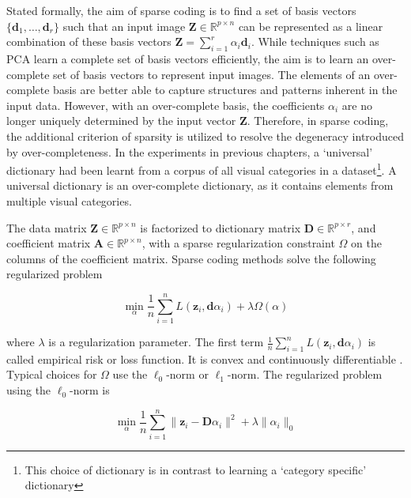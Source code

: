 Stated formally, the aim of sparse coding is to find a set of basis vectors $\{ \mathbf{d}_{1}, \ldots, \mathbf{d}_{r} \}$ such that an input image $\mathbf{Z} \in \mathds{R}^{p \times n}$ can be represented as a linear combination of these basis vectors $\mathbf{Z} = \sum_{i=1}^{r} \alpha_{i} \mathbf{d}_{i}$. While techniques such as PCA learn a complete set of basis vectors efficiently, the aim is to learn an over-complete set of basis vectors to represent input images. The elements of an over-complete basis are better able to capture structures and patterns inherent in the input data. However, with an over-complete basis, the coefficients $\alpha_{i}$ are no longer uniquely determined by the input vector $\mathbf{Z}$. Therefore, in sparse coding, the additional criterion of sparsity is utilized to resolve the degeneracy introduced by over-completeness. In the experiments in previous chapters, a `universal' dictionary had been learnt from a corpus of all visual categories in a dataset\footnote{This choice of dictionary is in contrast to learning a `category specific' dictionary}. A universal dictionary is an over-complete dictionary, as it contains elements from multiple visual categories. 

The data matrix $\mathbf{Z} \in \mathds{R}^{p \times n}$ is factorized to dictionary matrix $\mathbf{D} \in \mathds{R}^{p \times r}$, and coefficient matrix $\mathbf{A} \in \mathds{R}^{p \times n}$, with a sparse regularization constraint $\Omega$ on the columns of the coefficient matrix. Sparse coding methods solve the following regularized problem

\begin{equation} \label{eq:losssparsecoding}
 \min_{\alpha} \frac{1}{n} \sum_{i=1}^{n} L(\mathbf{z}_{i}, \mathbf{d} \alpha_{i}) + \lambda \Omega(\alpha)
\end{equation}

where $\lambda$ is a regularization parameter. The first term $\frac{1}{n} \sum_{i=1}^{n} L(\mathbf{z}_{i}, \mathbf{d} \alpha_{i})$ is called empirical risk or loss function. It is convex and continuously differentiable \citep{Jenatton2010}. Typical choices for $\Omega$ use the $\ell_{0}$-norm or $\ell_{1}$-norm. The regularized problem using the $\ell_{0}$-norm is

\begin{equation} \label{eq:l0normloss}
 \min_{\alpha} \frac{1}{n} \sum_{i=1}^{n} \parallel \mathbf{z}_{i} - \mathbf{D} \alpha_{i} \parallel^{2} + \lambda \parallel \alpha_{i} \parallel_{0}
\end{equation}

